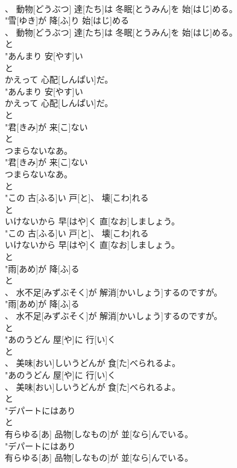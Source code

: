 \documentclass[8pt]{extreport}
\begin{document}
\begin{CJK}{UTF8}{min}
\\	、 動物[どうぶつ] 達[たち]は 冬眠[とうみん]を 始[はじ]める。
\\	"雪[ゆき]が 降[ふ]り 始[はじ]める
\\	、 動物[どうぶつ] 達[たち]は 冬眠[とうみん]を 始[はじ]める。
\\	と
\\	"あんまり 安[やす]い
\\	と
\\	かえって 心配[しんぱい]だ。
\\	"あんまり 安[やす]い
\\	かえって 心配[しんぱい]だ。
\\	と
\\	"君[きみ]が 来[こ]ない
\\	と
\\	つまらないなあ。
\\	"君[きみ]が 来[こ]ない
\\	つまらないなあ。
\\	と
\\	"この 古[ふる]い 戸[と]、 壊[こわ]れる
\\	と
\\	いけないから 早[はや]く 直[なお]しましょう。
\\	"この 古[ふる]い 戸[と]、 壊[こわ]れる
\\	いけないから 早[はや]く 直[なお]しましょう。
\\	と
\\	"雨[あめ]が 降[ふ]る
\\	と
\\	、 水不足[みずぶそく]が 解消[かいしょう]するのですが。
\\	"雨[あめ]が 降[ふ]る
\\	、 水不足[みずぶそく]が 解消[かいしょう]するのですが。
\\	と
\\	"あのうどん 屋[や]に 行[い]く
\\	と
\\	、 美味[おい]しいうどんが 食[た]べられるよ。
\\	"あのうどん 屋[や]に 行[い]く
\\	、 美味[おい]しいうどんが 食[た]べられるよ。
\\	と
\\	"デパートにはあり
\\	と
\\	有らゆる[あ] 品物[しなもの]が 並[なら]んでいる。
\\	"デパートにはあり
\\	有らゆる[あ] 品物[しなもの]が 並[なら]んでいる。

\end{CJK}
\end{document}
